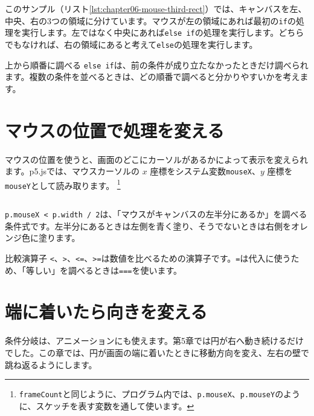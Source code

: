 このサンプル（リスト\ref{lst:chapter06-mouse-third-rect}）では、キャンバスを左、中央、右の3つの領域に分けています。マウスが左の領域にあれば最初の\texttt{if}の処理を実行します。左ではなく中央にあれば\texttt{else if}の処理を実行します。どちらでもなければ、右の領域にあると考えて\texttt{else}の処理を実行します。

\begin{pointbox}{上から順番に調べる}
\texttt{else if}は、前の条件が成り立たなかったときだけ調べられます。複数の条件を並べるときは、どの順番で調べると分かりやすいかを考えます。
\end{pointbox}

\section{マウスの位置で処理を変える}

マウスの位置を使うと、画面のどこにカーソルがあるかによって表示を変えられます。p5.jsでは、マウスカーソルの $x$ 座標をシステム変数\texttt{mouseX}、$y$ 座標を\texttt{mouseY}として読み取ります。
\footnote{\texttt{frameCount}と同じように、プログラム内では、\texttt{p.mouseX}、\texttt{p.mouseY}のように、スケッチを表す変数を通して使います。}

\begin{listing}[htbp]
\inputminted{ts}{typescript-p5/listings/chapter06/mouse-half-rect.ts}
\caption{マウスの位置で左右の領域を塗り分ける（\texttt{chapter06/mouse-half-rect.ts}）}
\label{lst:chapter06-mouse-half-rect}
\end{listing}

\texttt{p.mouseX < p.width / 2}は、「マウスがキャンバスの左半分にあるか」を調べる条件式です。左半分にあるときは左側を青く塗り、そうでないときは右側をオレンジ色に塗ります。

\begin{pointbox}{比較演算子}
\texttt{<}、\texttt{>}、\texttt{<=}、\texttt{>=}は数値を比べるための演算子です。\texttt{=}は代入に使うため、「等しい」を調べるときは\texttt{===}を使います。
\end{pointbox}

\section{端に着いたら向きを変える}

条件分岐は、アニメーションにも使えます。第5章では円が右へ動き続けるだけでした。この章では、円が画面の端に着いたときに移動方向を変え、左右の壁で跳ね返るようにします。

